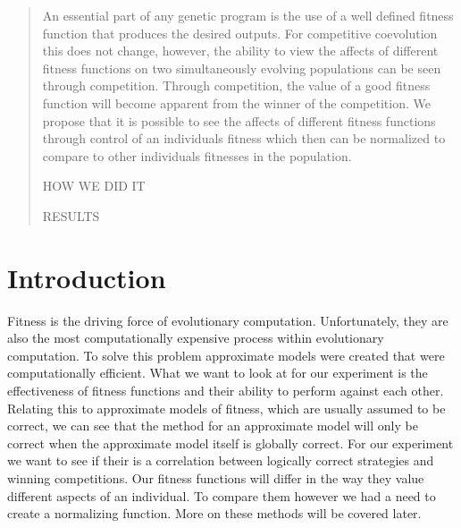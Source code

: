 \documentclass{acm_proc_article-sp}
\begin{document}

\maketitle
\begin{abstract}

An essential part of any genetic program is the use of a well defined fitness function that produces the desired outputs. For competitive coevolution this does not change, however, the ability to view the affects of different fitness functions on two simultaneously evolving populations can be seen through competition. Through competition, the value of a good fitness function will become apparent from the winner of the competition. We propose that it is possible to see the affects of different fitness functions through control of an individuals fitness which then can be normalized to compare to other individuals fitnesses in the population.

HOW WE DID IT

RESULTS

\end{abstract}




\section{Introduction} %

Fitness is the driving force of evolutionary computation. Unfortunately, they are also the most computationally expensive process within evolutionary computation. To solve this problem approximate models were created that were computationally efficient\cite{Fitness}. What we want to look at for our experiment is the effectiveness of fitness functions and their ability to perform against each other. Relating this to approximate models of fitness, which are usually assumed to be correct\cite{Fitness}, we can see that the method for an approximate model will only be correct when the approximate model itself is globally correct. For our experiment we want to see if their is a correlation between logically correct strategies and winning competitions. Our fitness functions will differ in the way they value different aspects of an individual. To compare them however we had a need to create a normalizing function. More on these methods will be covered later. 
\end{document}
